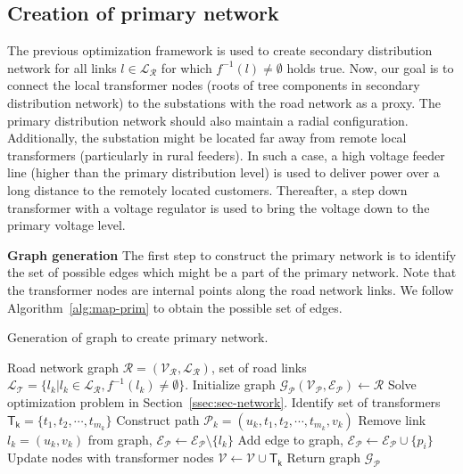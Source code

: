 \documentclass[sigconf]{acmart}
\begin{document}
\subsection{Creation of primary network}\label{ssec:primary}
The previous optimization framework is used to create secondary distribution network for all links $l\in\mathcal{L_R}$ for which $f^{-1}(l)\neq\emptyset$ holds true. Now, our goal is to connect the local transformer nodes (roots of tree components in secondary distribution network) to the substations with the road network as a proxy. The primary distribution network should also maintain a radial configuration. Additionally, the substation might be located far away from remote local transformers (particularly in rural feeders). In such a case, a high voltage feeder line (higher than the primary distribution level) is used to deliver power over a long distance to the remotely located customers. Thereafter, a step down transformer with a voltage regulator is used to bring the voltage down to the primary voltage level.

\noindent\textbf{Graph generation}
The first step to construct the primary network is to identify the set of possible edges which might be a part of the primary network. Note that the transformer nodes are internal points along the road network links. We follow Algorithm~\ref{alg:map-prim} to obtain the possible set of edges. 
\begin{algorithm}
	\caption{Generation of graph to create primary network.}
	\label{alg:map-prim}
	\begin{algorithmic}[1]
		\REQUIRE Road network graph $\mathcal{R}=(\mathcal{V_R},\mathcal{L_R})$, set of road links $\mathcal{L_T}=\big\{l_k\big|l_k\in\mathcal{L_R},f^{-1}(l_k)\neq\emptyset\big\}$.
		\STATE Initialize graph $\mathcal{G_P}(\mathcal{V_P},\mathcal{E_P})\leftarrow\mathcal{R}$
		\STATE Solve optimization problem in Section~\ref{ssec:sec-network}.
		\STATE Identify set of transformers $\mathsf{T_k}=\{t_{1},t_{2},\cdots,t_{m_k}\}$
		\STATE Construct path $\mathcal{P}_k=(u_k,t_{1},t_{2},\cdots,t_{m_k},v_k)$
		\STATE Remove link $l_k=(u_k,v_k)$ from graph, $\mathcal{E_P}\leftarrow\mathcal{E_P}\setminus\{l_k\}$
		\STATE Add edge to graph, $\mathcal{E_P}\leftarrow\mathcal{E_P}\cup \{p_i\}$
		\ENDFOR
		\STATE Update nodes with transformer nodes $\mathcal{V}\leftarrow\mathcal{V}\cup\mathsf{T_k}$
		\ENDFOR
		\STATE Return graph $\mathcal{G_P}$
	\end{algorithmic}
\end{algorithm}
\end{document}
